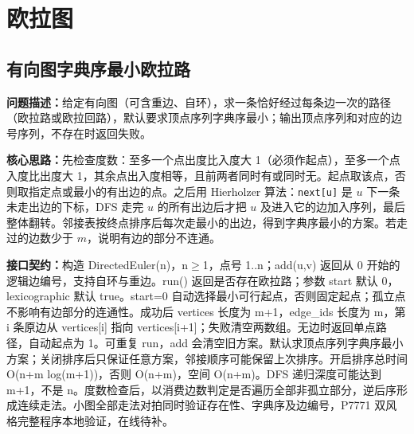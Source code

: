 \Needspace{654pt}

\chapter{欧拉图}

\section{有向图字典序最小欧拉路}\label{compact-DirectedEuler}

\noindent\textbf{问题描述：}\allowbreak 给定有向图（可含重边、自环），求一条恰好经过每条边一次的路径（欧拉路或欧拉回路），默认要求顶点序列字典序最小；输出顶点序列和对应的边号序列，不存在时返回失败。

\textbf{核心思路：}\allowbreak 先检查度数：至多一个点出度比入度大 1（必须作起点），至多一个点入度比出度大 1，其余点出入度相等，且前两者同时有或同时无。起点取该点，否则取指定点或最小的有出边的点。之后用 Hierholzer 算法：\texttt{next[u]} 是 $u$ 下一条未走出边的下标，DFS 走完 $u$ 的所有出边后才把 $u$ 及进入它的边加入序列，最后整体翻转。邻接表按终点排序后每次走最小的出边，得到字典序最小的方案。若走过的边数少于 $m$，说明有边的部分不连通。



{\sloppy{}\noindent\textbf{接口契约：}构造 DirectedEuler(n)，n$\ge$1，点号 1..n；add(u,v) 返回从 0 开始的逻辑边编号，支持自环与重边。run() 返回是否存在欧拉路；参数 start 默认 0，lexicographic 默认 true。start=0 自动选择最小可行起点，否则固定起点；孤立点不影响有边部分的连通性。成功后 vertices 长度为 m+1，edge\_ids 长度为 m，第 i 条原边从 vertices[i] 指向 vertices[i+1]；失败清空两数组。无边时返回单点路径，自动起点为 1。可重复 run，add 会清空旧方案。默认求顶点序列字典序最小方案；关闭排序后只保证任意方案，邻接顺序可能保留上次排序。开启排序总时间 O(n+m log(m+1))，否则 O(n+m)，空间 O(n+m)。DFS 递归深度可能达到 m+1，不是 n。度数检查后，以消费边数判定是否遍历全部非孤立部分，逆后序形成连续走法。小图全部走法对拍同时验证存在性、字典序及边编号，P7771 双风格完整程序本地验证，在线待补。\par}

\Needspace{506pt}



\newpage



\Needspace{407pt}

